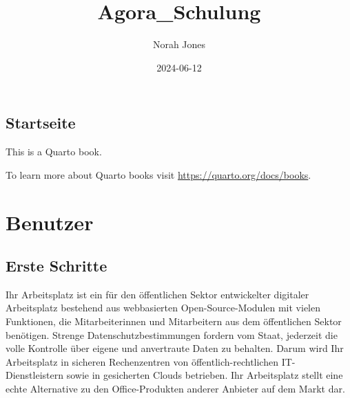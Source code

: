 \documentclass[
  letterpaper,
  DIV=11,
  numbers=noendperiod]{scrreprt}
\title{Agora\_Schulung}
\author{Norah Jones}
\date{2024-06-12}
\renewcommand*\contentsname{Table of contents}
\newcommand\contentsname{Table of contents}
\begin{document}
\maketitle

\renewcommand*\contentsname{Table of contents}
{
\hypersetup{linkcolor=}
\setcounter{tocdepth}{2}
\tableofcontents
}


\chapter*{Startseite}\label{startseite}


This is a Quarto book.

To learn more about Quarto books visit
\url{https://quarto.org/docs/books}.

\part{Benutzer}

\chapter{Erste Schritte}\label{erste-schritte}

Ihr Arbeitsplatz ist ein für den öffentlichen Sektor entwickelter
digitaler Arbeitsplatz bestehend aus webbasierten Open-Source-Modulen
mit vielen Funktionen, die Mitarbeiterinnen und Mitarbeitern aus dem
öffentlichen Sektor benötigen. Strenge Datenschutzbestimmungen fordern
vom Staat, jederzeit die volle Kontrolle über eigene und anvertraute
Daten zu behalten. Darum wird Ihr Arbeitsplatz in sicheren Rechenzentren
von öffentlich-rechtlichen IT-Dienstleistern sowie in gesicherten Clouds
betrieben. Ihr Arbeitsplatz stellt eine echte Alternative zu den
Office-Produkten anderer Anbieter auf dem Markt dar.
\end{document}
